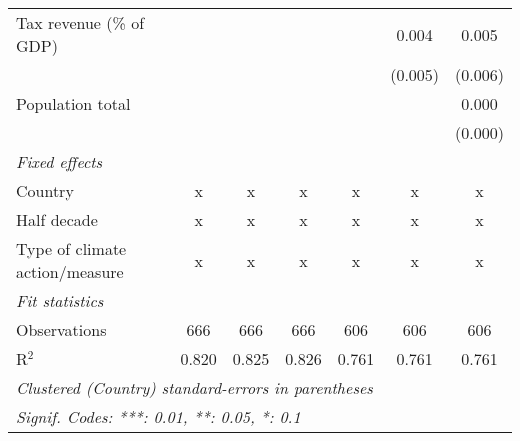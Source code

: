 \begin{tabular}{lcccccc}
   Tax revenue (\% of GDP)                                   &              &                &               &               & 0.004         & 0.005\\   
                                                             &              &                &               &               & (0.005)       & (0.006)\\   
   Population total                                          &              &                &               &               &               & 0.000\\   
                                                             &              &                &               &               &               & (0.000)\\   
   \emph{Fixed effects}\\
   Country                                                   & x            & x              & x             & x             & x             & x\\  
   Half decade                                               & x            & x              & x             & x             & x             & x\\  
   Type of climate action/measure                            & x            & x              & x             & x             & x             & x\\  
   \midrule \emph{Fit statistics}\\
   Observations                                              & 666          & 666            & 666           & 606           & 606           & 606\\  
   R$^2$                                                     & 0.820        & 0.825          & 0.826         & 0.761         & 0.761         & 0.761\\  
   \midrule
   \multicolumn{7}{l}{\emph{Clustered (Country) standard-errors in parentheses}}\\
   \multicolumn{7}{l}{\emph{Signif. Codes: ***: 0.01, **: 0.05, *: 0.1}}\\
\end{tabular}
\par\endgroup


